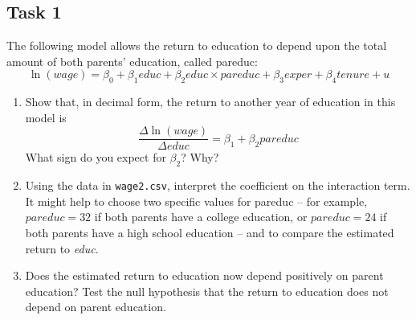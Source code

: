 \documentclass[10pt,a4paper]{amsart}
\begin{document}


\subsection*{Task 1}

The following model allows the return to education to depend upon the total amount of
both parents’ education, called pareduc:
\[
      \ln(wage) = \beta_{0} + \beta_{1} educ + \beta_{2}educ \times pareduc +\beta_{3} exper
      + \beta_{4}tenure + u
\]
\begin{enumerate}
      \item Show that, in decimal form, the return to another year of education in this model is
            \[\frac{\Delta \ln (wage)}{\Delta educ} = \beta_{1} + \beta_{2} pareduc\]
            What sign do you expect for $ \beta_{2} $? Why?
      \item Using the data in \texttt{wage2.csv}, interpret the coefficient on the interaction term.
            It might help to choose two specific values for pareduc -- for example, $ pareduc = 32 $ if
            both parents have a college education, or $ pareduc = 24 $ if both parents have a high school
            education -- and to compare the estimated return to \textit{educ}.
      \item Does the estimated return to education now depend positively on parent education? Test the
            null hypothesis that the return to education does not depend on parent education.
\end{enumerate}
\end{document}
